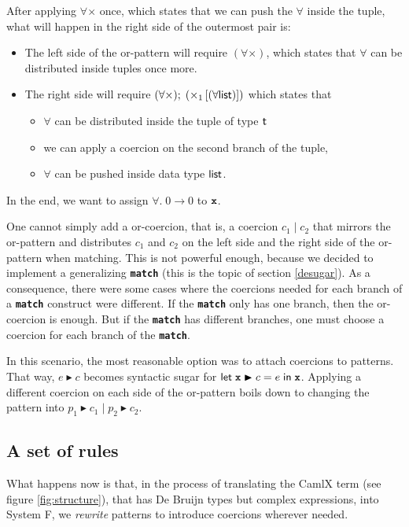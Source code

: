 \documentclass[10pt,a4paper,twoside,titlepage,twocolumn]{article}
\newcommand{\code}[1]{\textbf{\texttt{#1}}}
\begin{document}
After applying $\forall\times$ once, which states that we can push the $\forall$
inside the tuple, what will happen in the right side of the outermost pair is:
\begin{itemize}
  \item The left side of the or-pattern will require $(\forall\times)$, which states
    that $\forall$ can be distributed inside tuples once more.
  \item The right side will require
    $(\forall\times);\;(\times_1\left[ (\forall \text{\textsf{list}}) \right])$
    which states
    that 
    \begin{itemize}
      \item $\forall$ can be distributed inside the tuple of type $\text{\textsf{t}}$
      \item we can apply a coercion on the second branch of the tuple,
      \item $\forall$ can be pushed inside data type $\text{\textsf{list}}$.
    \end{itemize}
\end{itemize}
In the end, we want to assign $\forall.\;0\to0$ to $\evid$.

One cannot simply add a or-coercion, that is, a coercion $c_1\;|\;c_2$ that
mirrors the or-pattern and distributes $c_1$ and $c_2$ on the left side and the
right side of the or-pattern when matching. This is not powerful enough, because
we decided to implement a generalizing \code{match} (this is the topic of
section \vref{desugar}). As a consequence, there were some cases where the
coercions needed for each branch of a \code{match} construct were different. If
the \code{match} only has one branch, then the or-coercion is enough. But if the
\code{match} has different branches, one must choose a coercion for each branch
of the \code{match}.

In this scenario, the most reasonable option was to attach coercions to
patterns. That way, $e \blacktriangleright c$ becomes syntactic sugar for
$\kwd{let}\; \evid \blacktriangleright c = e\;\kwd{in}\; \evid$. Applying a
different coercion on each side of the or-pattern boils down to changing the
pattern into $p_1 \blacktriangleright c_1\;|\; p_2 \blacktriangleright c_2$.

\subsection{A set of rules}

What happens now is that, in the process of translating the CamlX term
(see figure \vref{fig:structure}), that has De Bruijn types but complex
expressions, into System F, we \emph{rewrite} patterns to introduce coercions
wherever needed.
\end{document}
